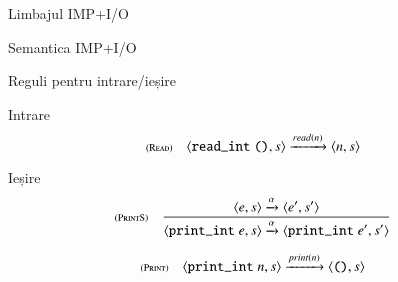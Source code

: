 \documentclass[xcolor=pdftex,romanian,colorlinks]{beamer}
\begin{document}
\begin{section}{Limbajul IMP+I/O}
\begin{subsection}{Semantica IMP+I/O}
\begin{frame}{Reguli pentru intrare/ieșire}
\begin{block}{Intrare}
\[\reg[Read]{\Ss[read(n)]{\c{\terminal{read\_int} {\Sskip},s}}{\c{n,s}}}{}{}\]
\end{block}

\begin{block}{Ieșire}
\[\reg[PrintS]{\Ss[\alpha]{\c{\terminal{print\_int} e, s}}{\c{\terminal{print\_int} e', s'}}}{\Ss[\alpha]{\c{e,s}}{\c{e',s'}}}{}\]

\[\reg[Print]{\Ss[print(n)]{\c{\terminal{print\_int} n,s}}{\c{\Sskip,s}}}{}{}\]
\end{block}

\end{frame}
\end{subsection}
\end{section}
\end{document}
